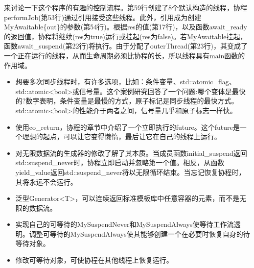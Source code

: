来讨论一下这个程序的有趣的控制流程。第59行创建了8个默认构造的线程，协程performJob(第53行)通过引用接受这些线程。此外，引用成为创建MyAwaitable\{out\}的参数(第54行)。根据res的值(第17行)，以及函数await\_ready的返回值，协程将继续(res为true)运行或挂起(res为false)。若MyAwaitable挂起，函数await\_suspend(第22行)将执行。由于分配了outerThread(第23行)，其变成了一个正在运行的线程，从而生命周期必须比协程的长，所以线程具有main函数的作用域。

\begin{tcolorbox}[breakable,enhanced jigsaw,colback=mygreen!5!white,colframe=mygreen!75!black,title={总结}]
	
\begin{itemize}
\item 
想要多次同步线程时，有许多选项，比如：条件变量、std::atomic\_flag、std::atomic<bool>或信号量。这个案例研究回答了一个问题:哪个变体是最快的?数字表明，条件变量是最慢的方式，原子标记是同步线程的最快方式。std::atomic<bool>的性能介于两者之间，信号量几乎和原子标志一样快。

\item 
使用co\_return，协程的章节中介绍了一个立即执行的future。这个future是一个理想的起点，可以让它变得懒惰，最后让它在自己的线程上运行。

\item 
对无限数据流的生成器的修改了解了其本质。当成员函数initial\_suspend返回std::suspend\_never时，协程立即启动并忽略第一个值。相反，从函数yield\_value返回std::suspend\_never将以无限循环结束。当忘记恢复协程时，其将永远不会运行。

\item 
泛型Generator<T>，可以连续返回标准模板库中任意容器的元素，而不是无限的数据流。

\item 
实现自己的可等待的MySuspendNever和MySuspendAlways使等待工作流透明。调整可等待的MySuspendAlways使其能够创建一个在必要时恢复自身的待等待对象。

\item 
修改可等待对象，可使协程在其他线程上恢复运行。
\end{itemize}
	
\end{tcolorbox}





















